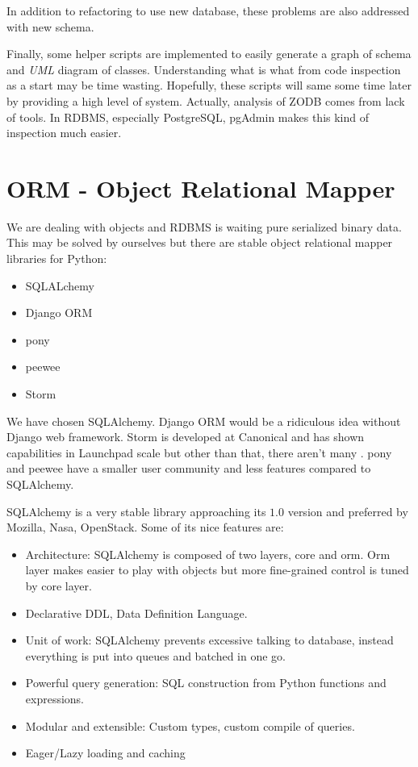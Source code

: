 In addition to refactoring to use new database, these problems are also addressed with new schema.

Finally, some helper scripts are implemented to easily generate a graph of schema and \textit{UML} diagram of classes. Understanding what is what from code inspection as a start may be time wasting. Hopefully, these scripts will same some time later by providing a high level of system. Actually, analysis of ZODB comes from lack of tools. In RDBMS, especially PostgreSQL, pgAdmin makes this kind of inspection much easier.

\section{ORM - Object Relational Mapper}

We are dealing with objects and RDBMS is waiting pure serialized binary data. This may be solved by ourselves but there are stable object relational mapper libraries for Python:
\begin{itemize}
  \item SQLALchemy
  \item Django ORM
  \item pony
  \item peewee
  \item Storm
\end{itemize}

We have chosen SQLAlchemy. Django ORM would be a ridiculous idea without Django web framework. Storm is developed at Canonical and has shown capabilities in Launchpad scale but other than that, there aren't many . pony and peewee have a smaller user community and less features compared to SQLAlchemy.

SQLAlchemy is a very stable library approaching its $1.0$ version and preferred by Mozilla, Nasa, OpenStack. Some of its nice features are:
\begin{itemize}
  \item Architecture: SQLAlchemy is composed of two layers, core and orm. Orm layer makes easier to play with objects but more fine-grained control is tuned by core layer.
  \item Declarative DDL, Data Definition Language.
  \item Unit of work: SQLAlchemy prevents excessive talking to database, instead everything is put into queues and batched in one go.
  \item Powerful query generation: SQL construction from Python functions and expressions.
  \item Modular and extensible: Custom types, custom compile of queries.
  \item Eager/Lazy loading and caching
\end{itemize}

